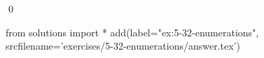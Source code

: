 
\begin{ex}
  \label{ex:5-32-enumerations}
  
  \qed
\end{ex}
\begin{python0}
from solutions import *
add(label="ex:5-32-enumerations",
    srcfilename='exercises/5-32-enumerations/answer.tex')
\end{python0}
